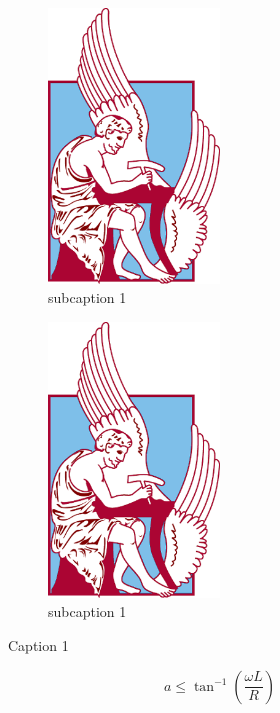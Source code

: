 \begin{figure}[h]
	\centering
	\begin{subfigure}{.5\textwidth}
		\centering
		\includegraphics[width=0.5\textwidth]{Images/university.png}
		\caption{subcaption 1}
		\label{circ:1_phase_D}
	\end{subfigure}%
	\begin{subfigure}{.5\textwidth}
		\centering
		\includegraphics[width=0.5\textwidth]{Images/university.png}
		\caption{subcaption 1}
		\label{circ:1_phase_Th}
	\end{subfigure}
	\caption{Caption 1}
\end{figure}

\begin{equation}
	a \leq \tan^{-1} \left(\frac{\omega L}{R} \right) \label{eq:Q11_V_o}
\end{equation}
